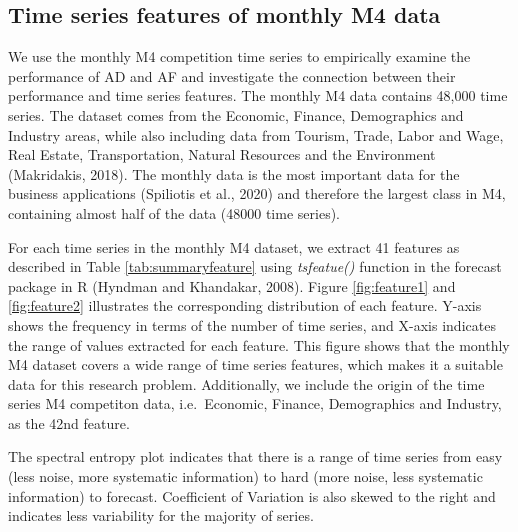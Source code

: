 \documentclass[]{elsarticle} %
\begin{document}
\hypertarget{mtsmeasure}{%
\subsection{Time series features of monthly M4 data}\label{mtsmeasure}}

We use the monthly M4 competition time series to empirically examine the
performance of AD and AF and investigate the connection between their
performance and time series features. The monthly M4 data contains
48,000 time series. The dataset comes from the Economic, Finance,
Demographics and Industry areas, while also including data from Tourism,
Trade, Labor and Wage, Real Estate, Transportation, Natural Resources
and the Environment (Makridakis, 2018). The monthly data is the most
important data for the business applications (Spiliotis et al., 2020)
and therefore the largest class in M4, containing almost half of the
data (48000 time series).

For each time series in the monthly M4 dataset, we extract 41 features
as described in Table \ref{tab:summaryfeature} using \emph{tsfeatue()}
function in the forecast package in R (Hyndman and Khandakar, 2008).
Figure \ref{fig:feature1} and \ref{fig:feature2} illustrates the
corresponding distribution of each feature. Y-axis shows the frequency
in terms of the number of time series, and X-axis indicates the range of
values extracted for each feature. This figure shows that the monthly M4
dataset covers a wide range of time series features, which makes it a
suitable data for this research problem. Additionally, we include the
origin of the time series M4 competiton data, i.e.~Economic, Finance,
Demographics and Industry, as the 42nd feature.

The spectral entropy plot indicates that there is a range of time series
from easy (less noise, more systematic information) to hard (more noise,
less systematic information) to forecast. Coefficient of Variation is
also skewed to the right and indicates less variability for the majority
of series.
\end{document}

